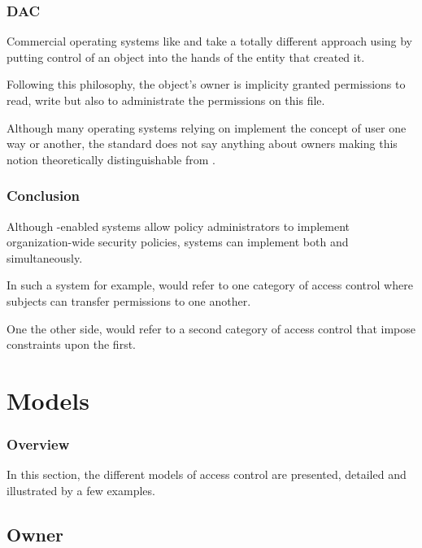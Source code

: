 \begin{frame}
  \frametitle{DAC}

  Commercial operating systems like  and  take a
  totally different approach using  by putting control of an object into the hands of the entity
  that created it.

  \-

  Following this philosophy, the object's owner is implicity granted
  permissions to read, write but also to administrate the permissions on
  this file.

  \-

  Although many operating systems relying on  implement the concept
  of user one way or another, the standard does not say anything about
  owners making this notion theoretically distinguishable from .
\end{frame}


\begin{frame}
  \frametitle{Conclusion}

  Although -enabled systems allow policy administrators to
  implement organization-wide security policies, systems can implement both
   and  simultaneously.

  \-

  In such a system for example,  would refer to one category of
  access control where subjects can transfer permissions to one another.

  \-

  One the other side,  would refer to a second category of access
  control that impose constraints upon the first.
\end{frame}

%
%

\section{Models}


\begin{frame}
  \frametitle{Overview}

  In this section, the different models of access control are presented,
  detailed and illustrated by a few examples.
\end{frame}


\subsection{Owner}

